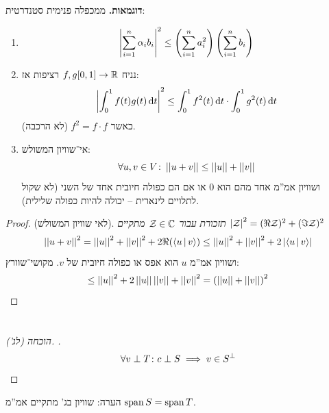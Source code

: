 \documentclass[]{../../../../tex/classes/styledArticle}
\begin{document}
   \textbf{דוגמאות. }ממכפלה פנימית סטנדרטית: 
   \begin{enumerate}
       \item \[ \sof{\sum_{i = 1}^{n}\ag_i b_i}^2 \le \cl{\sum_{i = 1}^{n}a_i^2} \cl{\sum_{i = 1}^{n}b_i} \]
       \item  נניח $f, g [0, 1] \to \R$ רציפות אז: 
       \[ \sof{\int^1_0 f(t)g(t) \dt}^2 \le \int_{0}^{1}f^2(t) \dt \cdot\int^1_0 g^2(t) \dt \]
       כאשר $f^2 = f \cdot f$ (לא הרכבה). 
       \item אי־שוויון המשולש: 
       \[ \forall u, v \in V \co \norm{u + v} \le \norm{u} + \norm{v} \]
       ושוויון אמ''מ אחד מהם הוא $0$ או אם הם כפולה חיובית אחד של השני (לא שקול לתלויים לינארית – יכולה להיות כפולה שלילית). 
   \end{enumerate}
   \begin{proof}
       (לאי שוויון המשולש). 
       \textit{תזכורת עבור $\zc \in \C$ מתקיים $\sof{\zc}^2 = (\Re \zc)^2 + (\Im \zc)^2$}
       \[ \norm{u + v}^2 = \norm{u}^2 + \norm{v}^2 + 2\Re(\mut{u}{v}) \le \norm{u}^2 + \norm{v}^2 + 2\sof{\mut{u}{v}}  \]
       ושוויון אמ''מ $u$ הוא אפס או כפולה חיובית של $v$. מקושי־שוורץ: 
       \[ \le \norm{u}^2 + 2\norm{u}\norm{v} + \norm{v}^2 = \cl{\norm{u} + \norm{v}}^2 \]
   \end{proof}
   
   \section{}
    \begin{proof}[הוכחה (לג'). ]
        \[ \forall v \perp T \co c \perp S \implies v \in S^{\perp} \]
    \end{proof}
    הערה: שוויון בג' מתקיים אמ''מ $\Sp S = \Sp T$. 
    
\end{document}
